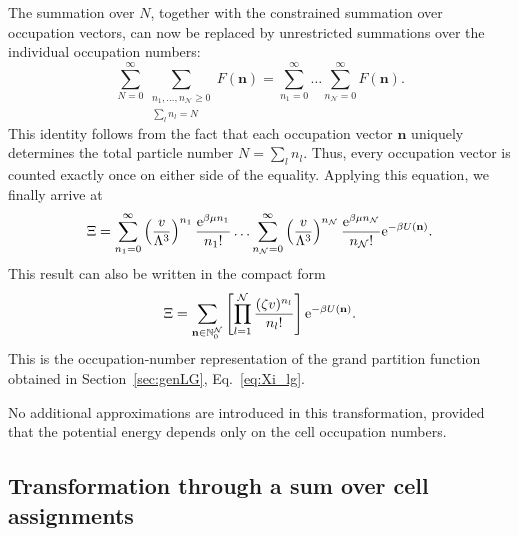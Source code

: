 \documentclass[12pt]{article}
\begin{document}
	The summation over $N$, together with the constrained summation over occupation vectors, can now be replaced by unrestricted summations over the individual occupation numbers:
	\begin{equation}
		\sum_{N=0}^{\infty} \sum_{\substack{n_1, \ldots, n_{\mathcal{N}} \geq 0 \\ \sum_l n_l = N}} F(\mathbf{n}) = \sum_{n_1=0}^{\infty} \ldots \sum_{n_{\mathcal{N}}=0}^{\infty} F(\mathbf{n}).
	\end{equation}
	This identity follows from the fact that each occupation vector $\mathbf{n}$ uniquely determines the total particle number $N=\sum_l n_l$. Thus, every occupation vector is counted exactly once on either side of the equality. Applying this equation, we finally arrive at
	\begin{equation}
		\Xi = \sum_{n_1 = 0}^\infty \left(\frac{v}{\Lambda^3}\right)^{n_1} \frac{{\rm e}^{\beta\mu n_1}}{n_1!} \ldots \sum_{n_{\mathcal{N}} = 0}^\infty \left(\frac{v}{\Lambda^3}\right)^{n_{\mathcal{N}}} \frac{{\rm e}^{\beta\mu n_{\mathcal{N}}}}{n_{\mathcal{N}}!} {\rm e}^{-\beta U(\mathbf{n})}.
	\end{equation}
	This result can also be written in the compact form
	\begin{equation}
		\Xi = \sum_{\mathbf{n} \in \mathbb{N}_0^{\mathcal{N}}} \left[\prod\limits_{l=1}^{\mathcal{N}} \frac{(\zeta v)^{n_l}}{n_l!}\right] {\rm e}^{-\beta U(\mathbf{n})}.
	\end{equation}
	This is the occupation-number representation of the grand partition function obtained in Section~\ref{sec:genLG}, Eq.~\eqref{eq:Xi_lg}.
	
	No additional approximations are introduced in this transformation, provided that the potential energy depends only on the cell occupation numbers.
	
	\subsection{Transformation through a sum over cell assignments}
	
\end{document}
